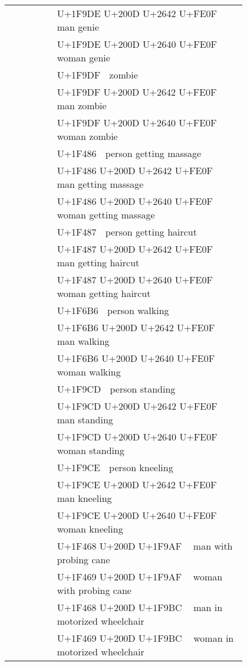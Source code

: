 \documentclass[a4paper,12pt]{article}
\newcommand{\fontA}[1]{{\fontspec[RawFeature={mode=harf,+dist,+ccmp}]{Segoe UI Emoji} #1}}
\newcommand{\fontB}[1]{{\fontspec[RawFeature={mode=harf,+dist,+ccmp}]{Noto Color Emoji} #1}}
\begin{document}
\begin{longtable}[c]{ccp{0.8\linewidth}}
\fontA{🧞‍♂️}&\fontB{🧞‍♂️}&U+1F9DE U+200D U+2642 U+FE0F 🧞‍♂️ man genie\\
\fontA{🧞‍♀️}&\fontB{🧞‍♀️}&U+1F9DE U+200D U+2640 U+FE0F 🧞‍♀️ woman genie\\
\fontA{🧟}&\fontB{🧟}&U+1F9DF 🧟 zombie\\
\fontA{🧟‍♂️}&\fontB{🧟‍♂️}&U+1F9DF U+200D U+2642 U+FE0F 🧟‍♂️ man zombie\\
\fontA{🧟‍♀️}&\fontB{🧟‍♀️}&U+1F9DF U+200D U+2640 U+FE0F 🧟‍♀️ woman zombie\\
\fontA{💆}&\fontB{💆}&U+1F486 💆 person getting massage\\
\fontA{💆‍♂️}&\fontB{💆‍♂️}&U+1F486 U+200D U+2642 U+FE0F 💆‍♂️ man getting massage\\
\fontA{💆‍♀️}&\fontB{💆‍♀️}&U+1F486 U+200D U+2640 U+FE0F 💆‍♀️ woman getting massage\\
\fontA{💇}&\fontB{💇}&U+1F487 💇 person getting haircut\\
\fontA{💇‍♂️}&\fontB{💇‍♂️}&U+1F487 U+200D U+2642 U+FE0F 💇‍♂️ man getting haircut\\
\fontA{💇‍♀️}&\fontB{💇‍♀️}&U+1F487 U+200D U+2640 U+FE0F 💇‍♀️ woman getting haircut\\
\fontA{🚶}&\fontB{🚶}&U+1F6B6 🚶 person walking\\
\fontA{🚶‍♂️}&\fontB{🚶‍♂️}&U+1F6B6 U+200D U+2642 U+FE0F 🚶‍♂️ man walking\\
\fontA{🚶‍♀️}&\fontB{🚶‍♀️}&U+1F6B6 U+200D U+2640 U+FE0F 🚶‍♀️ woman walking\\
\fontA{🧍}&\fontB{🧍}&U+1F9CD 🧍 person standing\\
\fontA{🧍‍♂️}&\fontB{🧍‍♂️}&U+1F9CD U+200D U+2642 U+FE0F 🧍‍♂️ man standing\\
\fontA{🧍‍♀️}&\fontB{🧍‍♀️}&U+1F9CD U+200D U+2640 U+FE0F 🧍‍♀️ woman standing\\
\fontA{🧎}&\fontB{🧎}&U+1F9CE 🧎 person kneeling\\
\fontA{🧎‍♂️}&\fontB{🧎‍♂️}&U+1F9CE U+200D U+2642 U+FE0F 🧎‍♂️ man kneeling\\
\fontA{🧎‍♀️}&\fontB{🧎‍♀️}&U+1F9CE U+200D U+2640 U+FE0F 🧎‍♀️ woman kneeling\\
\fontA{👨‍🦯}&\fontB{👨‍🦯}&U+1F468 U+200D U+1F9AF 👨‍🦯 man with probing cane\\
\fontA{👩‍🦯}&\fontB{👩‍🦯}&U+1F469 U+200D U+1F9AF 👩‍🦯 woman with probing cane\\
\fontA{👨‍🦼}&\fontB{👨‍🦼}&U+1F468 U+200D U+1F9BC 👨‍🦼 man in motorized wheelchair\\
\fontA{👩‍🦼}&\fontB{👩‍🦼}&U+1F469 U+200D U+1F9BC 👩‍🦼 woman in motorized wheelchair\\

\end{longtable}
\end{document}
